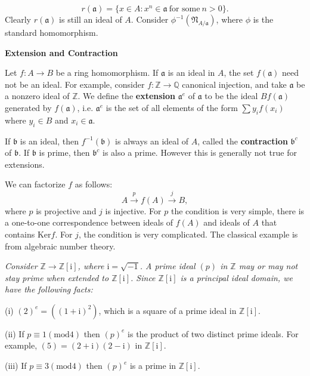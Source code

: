 $$r(\mathfrak{a})=\{x\in A:x^n\in\mathfrak{a}\ \text{for some}\ n>0\}.$$
Clearly $r(\mathfrak{a})$ is still an ideal of $A$. Consider $\phi^{-1}(\mathfrak{N}_{A/\mathfrak{a}})$, where $\phi$ is the standard homomorphism.
\begin{center}
\begin{large}
    \textbf{Extension and Contraction}
\end{large}
\end{center}
Let $f:A\to B$ be a ring homomorphism. If $\mathfrak{a}$ is an ideal in $A$, the set $f(\mathfrak{a})$ need not be an ideal. For example, consider $f:\mathbb{Z}\to\mathbb{Q}$ canonical injection, and take $\mathfrak{a}$ be a nonzero ideal of $\mathbb{Z}$. We define the \textbf{extension} $\mathfrak{a}^e$ of $\mathfrak{a}$ to be the ideal $Bf(\mathfrak{a})$ generated by $f(\mathfrak{a})$, i.e. $\mathfrak{a}^e$ is the set of all elements of the form $\sum y_if(x_i)$ where $y_i\in B$ and $x_i\in\mathfrak{a}$.\par
If $\mathfrak{b}$ is an ideal, then $f^{-1}(\mathfrak{b})$ is always an ideal of $A$, called the \textbf{contraction} $\mathfrak{b}^c$ of $\mathfrak{b}$. If $\mathfrak{b}$ is prime, then $\mathfrak{b}^c$ is also a prime. However this is generally not true for extensions.\par
We can factorize $f$ as follows: 
$$
A\overset{p}{\longrightarrow}f\left( A \right) \overset{j}{\longrightarrow}B,
$$
where $p$ is projective and $j$ is injective. For $p$ the condition is very simple, there is a one-to-one correspondence between ideals of $f(A)$ and ideals of $A$ that contains $\mathrm{Ker}f$. For $j$, the condition is very complicated. The classical example is from algebraic number theory.
\begin{example}\em
Consider $\mathbb{Z}\to\mathbb{Z}[\mathrm{i}]$, where $\mathrm{i}=\sqrt{-1}$. A prime ideal $(p)$ in $\mathbb{Z}$ may or may not stay prime when extended to $\mathbb{Z}[\mathrm{i}]$. Since $\mathbb{Z}[\mathrm{i}]$ is a principal ideal domain, we have the following facts: \par
(i) $(2)^e=((1+\mathrm{i})^2)$, which is a square of a prime ideal in $\mathbb{Z}[\mathrm{i}]$.\par
(ii) If $p\equiv 1(\mathrm{mod}4)$ then $(p)^e$ is the product of two distinct prime ideals. For example, $(5)=(2+\mathrm{i})(2-\mathrm{i})$ in $\mathbb{Z}[\mathrm{i}]$.\par
(iii) If $p\equiv 3(\mathrm{mod}4)$ then $(p)^e$ is a prime in $\mathbb{Z}[\mathrm{i}]$.
\end{example}
